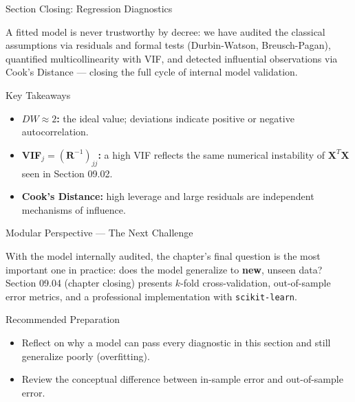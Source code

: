 \documentclass[10pt, aspectratio=169]{beamer}
\begin{document}
\begin{frame}{Section Closing: Regression Diagnostics}
  \begin{reflexion}
    A fitted model is never trustworthy by decree: we have audited the classical assumptions via residuals and formal tests (Durbin-Watson, Breusch-Pagan), quantified multicollinearity with VIF, and detected influential observations via Cook's Distance --- closing the full cycle of internal model validation.
  \end{reflexion}

  \vspace{0.2cm}
  \pause
  \begin{block}{Key Takeaways}
    \begin{itemize}\itemsep=0.08cm
      \item \textbf{$DW\approx2$:} the ideal value; deviations indicate positive or negative autocorrelation.
      \item \textbf{VIF$_j=(\mathbf{R}^{-1})_{jj}$:} a high VIF reflects the same numerical instability of $\mathbf{X}^T\mathbf{X}$ seen in Section 09.02.
      \item \textbf{Cook's Distance:} high leverage and large residuals are independent mechanisms of influence.
    \end{itemize}
  \end{block}
\end{frame}

\begin{frame}{Modular Perspective --- The Next Challenge}
  \scriptsize
  \begin{retoclase}
    With the model internally audited, the chapter's final question is the most important one in practice: does the model generalize to \textbf{new}, unseen data? Section 09.04 (chapter closing) presents $k$-fold cross-validation, out-of-sample error metrics, and a professional implementation with \texttt{scikit-learn}.
  \end{retoclase}

  \vspace{0.08cm}
  \pause
  \begin{alertblock}{Recommended Preparation}
    \begin{itemize}\itemsep=0.06cm
      \item Reflect on why a model can pass every diagnostic in this section and still generalize poorly (overfitting).
      \item Review the conceptual difference between in-sample error and out-of-sample error.
    \end{itemize}
  \end{alertblock}
\end{frame}
\end{document}
